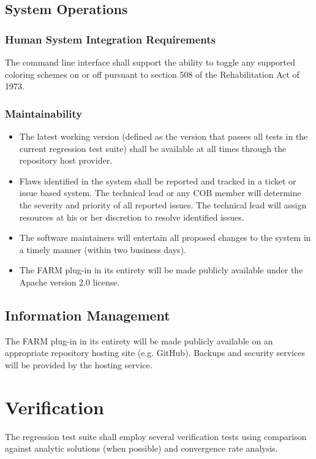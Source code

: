 \subsection{System Operations}
\subsubsection{Human System Integration Requirements}
The command line interface shall support the ability to toggle any supported coloring schemes on or off pursuant to section 
508 of the Rehabilitation Act of 1973.
\subsubsection{Maintainability}
\begin{itemize}
  \item The latest working version (defined as the version that passes all tests in the current regression test suite) shall be 
            available at all times through the repository host provider.
  \item  Flaws identified in the system shall be reported and tracked in a ticket or issue based system. The technical lead or 
            any COB member will 
            determine the severity and priority of all reported issues. The technical lead will assign resources at his or her 
            discretion to resolve identified issues.
  \item  The software maintainers will entertain all proposed changes to the system in a timely manner 
           (within two business days).        
  \item  The FARM plug-in in its entirety will be made publicly available under the Apache version 2.0 license.

\end{itemize}

\subsection{Information Management}
The FARM plug-in in its entirety will be made publicly available on an appropriate repository hosting site (e.g. GitHub).
Backups and security services will be provided by the hosting service.
%
%

\section{Verification}
The regression test suite shall employ several verification tests using comparison against analytic 
solutions (when possible) and convergence rate analysis. 
